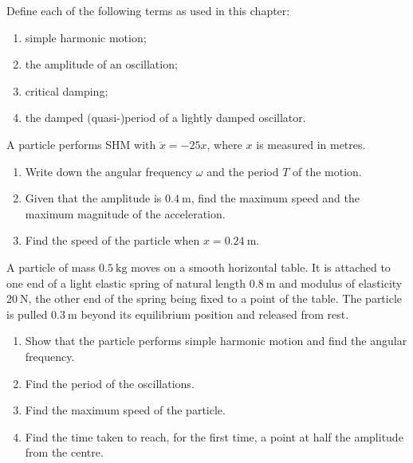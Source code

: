 \documentclass[11pt]{article}
\newcounter{popsec}
\newcounter{popsub}
\newcommand{\courssub}[1]{%
  \stepcounter{popsub}%
  \par\vspace{9pt}\noindent{\popxbold\fontsize{11.5}{13}\selectfont\color{popink}{\color{poporange}\thepopsec.\thepopsub}\hspace{6pt}#1}\par\nopagebreak\vspace{4pt}
}
\begin{document}
\begin{exercice}[Definitions]
Define each of the following terms as used in this chapter:
\begin{enumerate}
\item simple harmonic motion;
\item the amplitude of an oscillation;
\item critical damping;
\item the damped (quasi-)period of a lightly damped oscillator.
\end{enumerate}
\end{exercice}

\begin{exercice}
A particle performs SHM with $\ddot{x} = -25x$, where $x$ is measured in metres.
\begin{enumerate}
\item Write down the angular frequency $\omega$ and the period $T$ of the motion.
\item Given that the amplitude is $0.4\ \mathrm{m}$, find the maximum speed and the maximum magnitude of the acceleration.
\item Find the speed of the particle when $x = 0.24\ \mathrm{m}$.
\end{enumerate}
\end{exercice}

\courssub{I practise}

\begin{exercice}
A particle of mass $0.5\ \mathrm{kg}$ moves on a smooth horizontal table. It is attached to one end of a light elastic spring of natural length $0.8\ \mathrm{m}$ and modulus of elasticity $20\ \mathrm{N}$, the other end of the spring being fixed to a point of the table. The particle is pulled $0.3\ \mathrm{m}$ beyond its equilibrium position and released from rest.
\begin{enumerate}
\item Show that the particle performs simple harmonic motion and find the angular frequency.
\item Find the period of the oscillations.
\item Find the maximum speed of the particle.
\item Find the time taken to reach, for the first time, a point at half the amplitude from the centre.
\end{enumerate}
\end{exercice}
\end{document}
